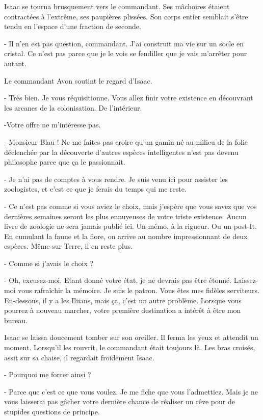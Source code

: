 \documentclass[12pt]{book}
\begin{document}
Isaac se tourna brusquement vers le commandant. Ses mâchoires étaient contractées à l'extrême, ses paupières plissées. Son corps entier semblait s'être tendu en l'espace d'une fraction de seconde.

- Il n'en est pas question, commandant. J'ai construit ma vie sur un socle en cristal. Ce n'est pas parce que je le vois se fendiller que je vais m'arrêter pour autant.

Le commandant Avon soutint le regard d'Isaac.

- Très bien. Je vous réquisitionne. Vous allez finir votre existence en découvrant les arcanes de la colonisation. De l’intérieur.

-Votre offre ne m’intéresse pas.

-  Monsieur Blau ! Ne me faites pas croire qu’un gamin né au milieu de la folie déclenchée par la découverte d’autres espèces intelligentes n’est pas devenu philosophe parce que ça le passionnait.

- Je n’ai pas de comptes à vous rendre. Je suis venu ici pour assister les zoologistes, et c’est ce que je ferais du temps qui me reste.

- Ce n’est pas comme si vous aviez le choix, mais j’espère que vous savez que vos dernières semaines seront les plus ennuyeuses de votre triste existence. Aucun livre de zoologie ne sera jamais publié ici. Un mémo, à la rigueur. Ou un post-It. En cumulant la faune et la flore, on arrive au nombre impressionnant de deux espèces. Même sur Terre, il en reste plus.

- Comme si j'avais le choix ?

- Oh, excusez-moi. Etant donné votre état, je ne devrais pas être étonné. Laissez-moi vous rafraîchir la mémoire. Je suis le patron. Vous êtes mes fidèles serviteurs. En-dessous, il y a les Iliians, mais ça, c’est un autre problème. Lorsque vous pourrez à nouveau marcher, votre première destination a intérêt à être mon bureau.

Isaac se laissa doucement tomber sur son oreiller. Il ferma les yeux et attendit un moment. Lorsqu’il les rouvrit, le commandant était toujours là. Les bras croisés, assit sur sa chaise, il regardait froidement Isaac.

- Pourquoi me forcer ainsi ?

- Parce que c’est ce que vous voulez. Je me fiche que vous l’admettiez. Mais je ne vous laisserai pas gâcher votre dernière chance de réaliser un rêve pour de stupides questions de principe.
\end{document}
